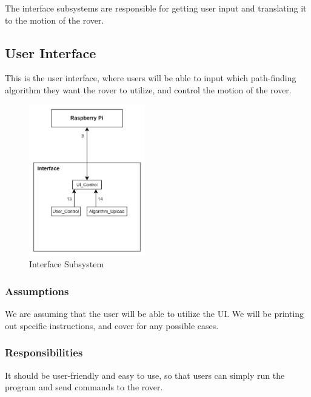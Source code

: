 The interface subsystems are responsible for getting user input and translating it to the motion of the rover.

\subsection{User Interface}
This is the user interface, where users will be able to input which path-finding algorithm they want the rover to utilize, and control the motion of the rover.

\begin{figure}[h!]
	\centering
 	\includegraphics[width=0.45\textwidth]{images/interface/interface.jpg}
 \caption{Interface Subsystem} %
\end{figure}




\subsubsection{Assumptions}
We are assuming that the user will be able to utilize the UI. We will be printing out specific instructions, and cover for any possible cases.

\subsubsection{Responsibilities}
It should be user-friendly and easy to use, so that users can simply run the program and send commands to the rover.

